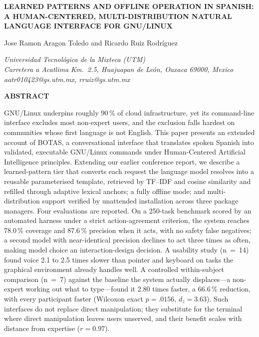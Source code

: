 \documentclass[10pt,a4paper]{article}
\begin{document}

{
\raggedright
\fontsize{16}{19.2}\bfseries
LEARNED PATTERNS AND OFFLINE OPERATION IN SPANISH:
A HUMAN-CENTERED, MULTI-DISTRIBUTION NATURAL
LANGUAGE INTERFACE FOR GNU/LINUX\par
\vspace{24pt}
}

{
\raggedright
\fontsize{11}{13.2}\selectfont
Jose Ramon Aragon Toledo and Ricardo Ruiz Rodr\'{i}guez\par
\vspace{6pt}
\fontsize{9}{10.8}\itshape
Universidad Tecnol\'{o}gica de la Mixteca (UTM)\\
Carretera a Acatlima Km.\ 2.5, Huajuapan de Le\'{o}n, Oaxaca 69000, Mexico\\
aatr010423@gs.utm.mx, rruiz@gs.utm.mx\par
}

\vspace{42pt}

{
\noindent\fontsize{9}{10.8}\bfseries ABSTRACT\par
\vspace{6pt}
\normalfont\fontsize{9}{10.8}\selectfont
\noindent
GNU/Linux underpins roughly 90\,\% of cloud infrastructure, yet its command-line interface excludes most non-expert users, and the exclusion falls hardest on communities whose first language is not English. This paper presents an extended account of BOTAS, a conversational interface that translates spoken Spanish into validated, executable GNU/Linux commands under Human-Centered Artificial Intelligence principles. Extending our earlier conference report, we describe a learned-pattern tier that converts each request the language model resolves into a reusable parameterised template, retrieved by TF--IDF and cosine similarity and refilled through adaptive lexical anchors; a fully offline mode; and multi-distribution support verified by unattended installation across three package managers. Four evaluations are reported. On a 250-task benchmark scored by an automated harness under a strict action-agreement criterion, the system reaches 78.0\,\% coverage and 87.6\,\% precision when it acts, with no safety false negatives; a second model with near-identical precision declines to act three times as often, making model choice an interaction-design decision. A usability study (n~=~14) found voice 2.1 to 2.5 times slower than pointer and keyboard on tasks the graphical environment already handles well. A controlled within-subject comparison (n~=~7) against the baseline the system actually displaces---a non-expert working out what to type---found it 2.80 times faster, a 66.6\,\% reduction, with every participant faster (Wilcoxon exact $p = .0156$, $d_z = 3.63$). Such interfaces do not replace direct manipulation; they substitute for the terminal where direct manipulation leaves users unserved, and their benefit scales with distance from expertise ($r = 0.97$).
\par
}
\end{document}
